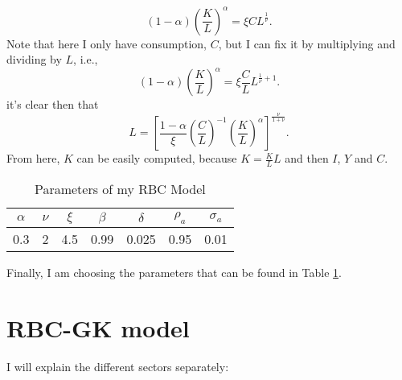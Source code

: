 \documentclass{article}
\begin{document}
\begin{equation}
	(1-\alpha)\left(\frac{K}{L}\right)^\alpha = \xi C L^{\frac{1}{\nu}}.
\end{equation}
Note that here I only have consumption, $C$, but I can fix it by multiplying and dividing by $L$, i.e.,
\begin{equation}
	(1-\alpha)\left(\frac{K}{L}\right)^\alpha = \xi \frac{C}{L} L^{\frac{1}{\nu}+1}.
\end{equation}
it's clear then that
\begin{equation}
	L = \left[\frac{1-\alpha}{\xi}\left(\frac{C}{L}\right)^{-1} \left(\frac{K}{L}\right)^{\alpha}\right]^{\frac{\nu}{1+\nu}}.
\end{equation}
From here, $K$ can be easily computed, because $K = \frac{K}{L} L$ and then $I$, $Y$ and $C$.
	\begin{table}
		\centering
		\caption{Parameters of my RBC Model}\label{tab:params}
		\begin{tabular}{ccccccc}
			$\alpha$ &$\nu$ & $\xi$ & $\beta$ & $\delta$ & $\rho_a$ & $\sigma_a$\\\hline\hline
			0.3 & 2 & 4.5 & 0.99 & 0.025 & 0.95 & 0.01 \\\hline
		\end{tabular}
	\end{table}
	Finally, I am choosing the parameters that can be found in Table \ref{tab:params}.

	\section{RBC-GK model}

	I will explain the different sectors separately:
\end{document}
